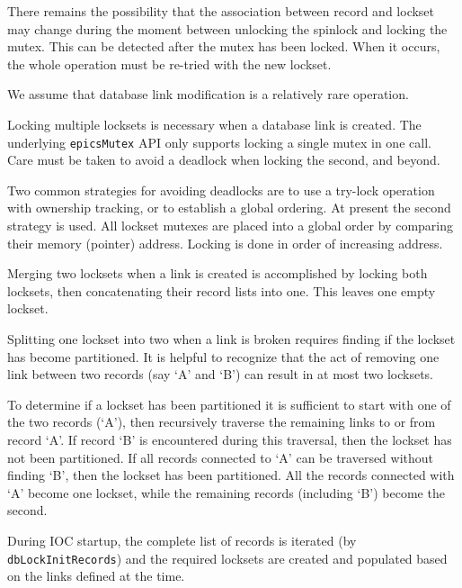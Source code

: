 There remains the possibility that the association between record and lockset may change during the moment between unlocking the spinlock and locking the mutex.
This can be detected after the mutex has been locked.
When it occurs, the whole operation must be re-tried with the new lockset.

We assume that database link modification is a relatively rare operation.

Locking multiple locksets is necessary when a database link is created.
The underlying \verb|epicsMutex| API only supports locking a single mutex in one call.
Care must be taken to avoid a deadlock when locking the second, and beyond.

Two common strategies for avoiding deadlocks are to use a try-lock operation with ownership tracking, or to establish a global ordering.
At present the second strategy is used.
All lockset mutexes are placed into a global order by comparing their memory (pointer) address.
Locking is done in order of increasing address.

Merging two locksets when a link is created is accomplished by locking both locksets, then concatenating their record lists into one.
This leaves one empty lockset.

Splitting one lockset into two when a link is broken requires finding if the lockset has become partitioned.
It is helpful to recognize that the act of removing one link between two records (say `A' and `B') can result in at most two locksets.

To determine if a lockset has been partitioned it is sufficient to start with one of the two records (`A'), then recursively traverse the remaining links to or from record `A'.
If record `B' is encountered during this traversal, then the lockset has not been partitioned.
If all records connected to `A' can be traversed without finding `B', then the lockset has been partitioned.
All the records connected with `A' become one lockset, while the remaining records (including `B') become the second.

During IOC startup, the complete list of records is iterated (by \verb|dbLockInitRecords|) and the required locksets are created and populated based on the links defined at the time.

